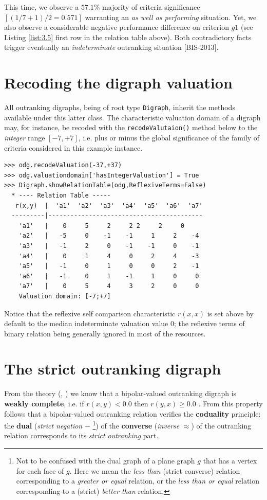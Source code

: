 This time, we observe a $57.1\%$ majority of criteria significance $[(1/7 + 1)/2 = 0.571]$ warranting an {\em as well as performing\/} situation. Yet, we also observe a considerable negative performance difference on criterion $g1$ (see Listing \ref{list:3.5} first row in the relation table above). Both contradictory facts trigger eventually an \emph{indeterminate} outranking situation [BIS-2013]. 

\section{Recoding the digraph valuation}
\label{sec:3.4}

All outranking digraphs, being of root type {\tt Digraph}, inherit the methods available under this latter class. The characteristic valuation domain of a digraph may, for instance,  be recoded with the {\tt recodeValutaion()} method below to the {\em integer\/} range $[-7,+7]$, i.e. plus or minus the global significance of the family of criteria considered in this example instance.

\begin{lstlisting}[caption={Recoding the digraph valuation},label=list:3.7]
>>> odg.recodeValuation(-37,+37)
>>> odg.valuationdomain['hasIntegerValuation'] = True
>>> Digraph.showRelationTable(odg,ReflexiveTerms=False)
  * ---- Relation Table -----
   r(x,y)  |  'a1'  'a2'  'a3'  'a4'  'a5'  'a6'  'a7'	  
  ---------|------------------------------------------
    'a1'   |    0     5     2     2	2     2     0	 
    'a2'   |   -5     0    -1	 -1     1     2    -4	 
    'a3'   |   -1     2     0	 -1    -1     0    -1	 
    'a4'   |    0     1     4	  0     2     4    -3	 
    'a5'   |   -1     0     1	  0     0     2    -1	 
    'a6'   |   -1     0     1	 -1     1     0     0	 
    'a7'   |    0     5     4	  3     2     0     0	 
    Valuation domain: [-7;+7]
\end{lstlisting}

Notice that the reflexive self comparison characteristic $r(x,x)$ is set above by default to the median indeterminate valuation value $0$; the reflexive terms of binary relation being generally ignored in most of the  resources. 

\section{The strict outranking digraph}
\label{sec:3.5}

From the theory (\cite{BIS-2013}, \cite{ADT-L7}) we know that a bipolar-valued outranking digraph is {\bf weakly complete}, i.e. if $r(x,y) < 0.0$ then $r(y,x) \geq 0.0$ . From this property follows that a bipolar-valued outranking relation verifies the {\bf coduality} principle: the {\bf dual} ({\em strict negation\/} $-$ \footnote{Not to be confused with the dual graph of a plane graph $g$ that has a vertex for each face of $g$. Here we mean the \emph{less than} (strict converse) relation corresponding to a \emph{greater or equal} relation, or the \emph{less than or equal} relation corresponding to a (strict) \emph{better than} relation.}) of the {\bf converse} ({\em inverse\/} $\approx$) of the outranking relation corresponds to its {\em strict outranking\/} part.

